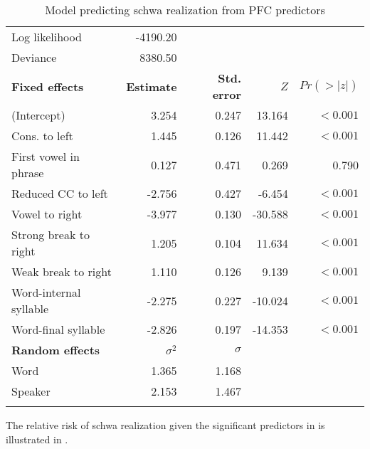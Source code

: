 \documentclass[output=paper,colorlinks,citecolor=brown,
]{langscibook}
\begin{document}
\begin{table}
\caption{Model predicting schwa realization from PFC predictors}
\label{tab:griffiths:results}
\begin{tabular}{lrrrr}
\lsptoprule
Log likelihood & -4190.20 &  &  &  \\
Deviance & 8380.50 &  &  &  \\ \midrule
\textbf{Fixed effects} & \textbf{Estimate} & \textbf{Std. error} & $Z$ & $Pr(>|z|)$ \\ \midrule
(Intercept) & 3.254 & 0.247 & 13.164 & $<0.001$ \\
Cons. to left & 1.445 & 0.126 & 11.442 & $<0.001$ \\
First vowel in phrase & 0.127 & 0.471 & 0.269 & 0.790 \\
Reduced CC to left & -2.756 & 0.427 & -6.454 & $<0.001$ \\
Vowel to right & -3.977 & 0.130 & -30.588 & $<0.001$ \\
Strong break to right & 1.205 & 0.104 & 11.634 & $<0.001$ \\
Weak break to right & 1.110 & 0.126 & 9.139 & $<0.001$ \\
Word-internal syllable & -2.275 & 0.227 & -10.024 & $<0.001$ \\
Word-final syllable & -2.826 & 0.197 & -14.353 & $<0.001$ \\ \midrule
\textbf{Random effects }& $\sigma^2$ & $\sigma$ &  &  \\ \midrule
Word & 1.365 & 1.168 &  &  \\
Speaker & 2.153 & 1.467 &  &  \\ \lspbottomrule
\end{tabular}
\end{table}

The relative risk of schwa realization given the significant predictors in  is illustrated in .
\end{document}
